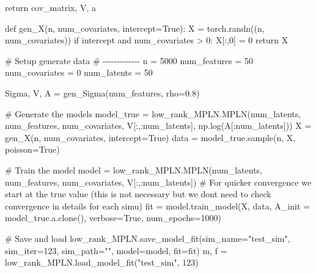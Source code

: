 \documentclass[
  letterpaper,
  DIV=11,
  numbers=noendperiod]{scrartcl}
\newenvironment{Shaded}{\begin{snugshade}}{\end{snugshade}}
\newcommand{\CommentTok}[1]{\textcolor[rgb]{0.37,0.37,0.37}{#1}}
\newcommand{\ControlFlowTok}[1]{\textcolor[rgb]{0.00,0.23,0.31}{#1}}
\newcommand{\DecValTok}[1]{\textcolor[rgb]{0.68,0.00,0.00}{#1}}
\newcommand{\FloatTok}[1]{\textcolor[rgb]{0.68,0.00,0.00}{#1}}
\newcommand{\KeywordTok}[1]{\textcolor[rgb]{0.00,0.23,0.31}{#1}}
\newcommand{\NormalTok}[1]{\textcolor[rgb]{0.00,0.23,0.31}{#1}}
\newcommand{\OperatorTok}[1]{\textcolor[rgb]{0.37,0.37,0.37}{#1}}
\newcommand{\StringTok}[1]{\textcolor[rgb]{0.13,0.47,0.30}{#1}}
\newcommand{\VariableTok}[1]{\textcolor[rgb]{0.07,0.07,0.07}{#1}}
\begin{document}
\begin{Shaded}
\begin{Highlighting}[]
    \ControlFlowTok{return}\NormalTok{ cov\_matrix, V, a}

\KeywordTok{def}\NormalTok{ gen\_X(n, num\_covariates, intercept}\OperatorTok{=}\VariableTok{True}\NormalTok{):}
\NormalTok{    X }\OperatorTok{=}\NormalTok{ torch.randn((n, num\_covariates))}
    \ControlFlowTok{if}\NormalTok{ intercept }\KeywordTok{and}\NormalTok{ num\_covariates }\OperatorTok{\textgreater{}} \DecValTok{0}\NormalTok{:}
\NormalTok{        X[:,}\DecValTok{0}\NormalTok{] }\OperatorTok{=} \DecValTok{0}
    \ControlFlowTok{return}\NormalTok{ X}

\CommentTok{\# Setup generate data}
\CommentTok{\# {-}{-}{-}{-}{-}{-}{-}{-}{-}{-}{-}{-}{-}}
\NormalTok{n }\OperatorTok{=} \DecValTok{5000}
\NormalTok{num\_features }\OperatorTok{=} \DecValTok{50}
\NormalTok{num\_covariates }\OperatorTok{=} \DecValTok{0}
\NormalTok{num\_latents }\OperatorTok{=} \DecValTok{50}

\NormalTok{Sigma, V, A }\OperatorTok{=}\NormalTok{ gen\_Sigma(num\_features, rho}\OperatorTok{=}\FloatTok{0.8}\NormalTok{)}

\CommentTok{\# Generate the models}
\NormalTok{model\_true }\OperatorTok{=}\NormalTok{ low\_rank\_MPLN.MPLN(num\_latents, num\_features, num\_covariates, V[:,:num\_latents], np.log(A[:num\_latents]))}
\NormalTok{X }\OperatorTok{=}\NormalTok{ gen\_X(n, num\_covariates, intercept}\OperatorTok{=}\VariableTok{True}\NormalTok{)}
\NormalTok{data }\OperatorTok{=}\NormalTok{ model\_true.sample(n, X, poisson}\OperatorTok{=}\VariableTok{True}\NormalTok{)}


\CommentTok{\# Train the model}
\NormalTok{model }\OperatorTok{=}\NormalTok{ low\_rank\_MPLN.MPLN(num\_latents, num\_features, num\_covariates, V[:,:num\_latents])}
\CommentTok{\# For quicker convergence we start at the true value (this is not necessary but we don\textquotesingle{}t need to check convergence in details for each simu) }
\NormalTok{fit }\OperatorTok{=}\NormalTok{ model.train\_model(X, data, A\_init }\OperatorTok{=}\NormalTok{ model\_true.a.clone(), verbose}\OperatorTok{=}\VariableTok{True}\NormalTok{, num\_epochs}\OperatorTok{=}\DecValTok{1000}\NormalTok{)}


\CommentTok{\# Save and load}
\NormalTok{low\_rank\_MPLN.save\_model\_fit(sim\_name}\OperatorTok{=}\StringTok{"test\_sim"}\NormalTok{, sim\_iter}\OperatorTok{=}\DecValTok{123}\NormalTok{, sim\_path}\OperatorTok{=}\StringTok{""}\NormalTok{, model}\OperatorTok{=}\NormalTok{model, fit}\OperatorTok{=}\NormalTok{fit)}
\NormalTok{m, f }\OperatorTok{=}\NormalTok{ low\_rank\_MPLN.load\_model\_fit(}\StringTok{"test\_sim"}\NormalTok{, }\DecValTok{123}\NormalTok{)}
\end{Highlighting}
\end{Shaded}
\end{document}
